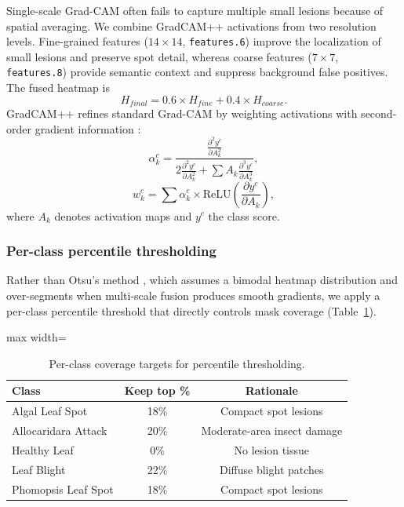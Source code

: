 \documentclass[final,5p,times,twocolumn,authoryear]{elsarticle}
\begin{document}
Single-scale Grad-CAM often fails to capture multiple small lesions because of spatial averaging. We combine GradCAM++ activations from two resolution levels. Fine-grained features ($14\times14$, \texttt{features.6}) improve the localization of small lesions and preserve spot detail, whereas coarse features ($7\times7$, \texttt{features.8}) provide semantic context and suppress background false positives. The fused heatmap is
\begin{equation}
H_{final} = 0.6 \times H_{fine} + 0.4 \times H_{coarse}.
\end{equation}
GradCAM++ refines standard Grad-CAM by weighting activations with second-order gradient information \citep{chattopadhay2018grad}:
\begin{equation}
\alpha_k^c = \frac{\frac{\partial^2 y^c}{\partial A_k^2}}{2\frac{\partial^2 y^c}{\partial A_k^2} + \sum A_k \frac{\partial^3 y^c}{\partial A_k^3}},
\end{equation}
\begin{equation}
w_k^c = \sum \alpha_k^c \times \text{ReLU}\left(\frac{\partial y^c}{\partial A_k}\right),
\end{equation}
where $A_k$ denotes activation maps and $y^c$ the class score.

\subsubsection{Per-class percentile thresholding}

Rather than Otsu's method \citep{otsu1979threshold}, which assumes a bimodal heatmap distribution and over-segments when multi-scale fusion produces smooth gradients, we apply a per-class percentile threshold that directly controls mask coverage (Table~\ref{tab:percentile}).

\begin{table}[!htbp]
\centering
\caption{Per-class coverage targets for percentile thresholding.}
\label{tab:percentile}
\begin{adjustbox}{max width=\columnwidth}
\begin{tabular}{lcc}
\toprule
\textbf{Class} & \textbf{Keep top \%} & \textbf{Rationale} \\
\midrule
Algal Leaf Spot     & 18\% & Compact spot lesions \\
Allocaridara Attack & 20\% & Moderate-area insect damage \\
Healthy Leaf        & 0\%  & No lesion tissue \\
Leaf Blight         & 22\% & Diffuse blight patches \\
Phomopsis Leaf Spot & 18\% & Compact spot lesions \\
\bottomrule
\end{tabular}
\end{adjustbox}
\end{table}
\end{document}
